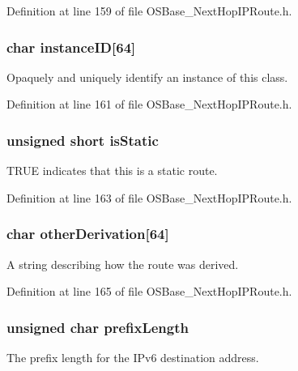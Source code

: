 Definition at line 159 of file OSBase\_\-NextHopIPRoute.h.\hypertarget{structnext_hop_i_p_a9c118b2dca982f7e028eac6ce61f473d}{
\subsubsection[{instanceID}]{\setlength{\rightskip}{0pt plus 5cm}char {\bf instanceID}\mbox{[}64\mbox{]}}}
\label{structnext_hop_i_p_a9c118b2dca982f7e028eac6ce61f473d}
Opaquely and uniquely identify an instance of this class. 

Definition at line 161 of file OSBase\_\-NextHopIPRoute.h.\hypertarget{structnext_hop_i_p_ad7b170c5e37a85ea0f8aa396968e5152}{
\subsubsection[{isStatic}]{\setlength{\rightskip}{0pt plus 5cm}unsigned short {\bf isStatic}}}
\label{structnext_hop_i_p_ad7b170c5e37a85ea0f8aa396968e5152}
TRUE indicates that this is a static route. 

Definition at line 163 of file OSBase\_\-NextHopIPRoute.h.\hypertarget{structnext_hop_i_p_aa688f0b965c7c598fd7c1a82ad48faf4}{
\subsubsection[{otherDerivation}]{\setlength{\rightskip}{0pt plus 5cm}char {\bf otherDerivation}\mbox{[}64\mbox{]}}}
\label{structnext_hop_i_p_aa688f0b965c7c598fd7c1a82ad48faf4}
A string describing how the route was derived. 

Definition at line 165 of file OSBase\_\-NextHopIPRoute.h.\hypertarget{structnext_hop_i_p_adb3af3680b75e1b054752a381729b906}{
\subsubsection[{prefixLength}]{\setlength{\rightskip}{0pt plus 5cm}unsigned char {\bf prefixLength}}}
\label{structnext_hop_i_p_adb3af3680b75e1b054752a381729b906}
The prefix length for the IPv6 destination address. 

